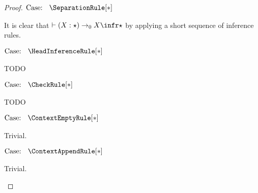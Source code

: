 \begin{proof}
$\text{Case: }\begin{array}{c} \SeparationRule[*] \end{array}$
\begin{proofcase}
    It is clear that $\vdash (X : \star) \to_0 X \infr \star$ by applying a short sequence of inference rules.
\end{proofcase}

$\text{Case: }\begin{array}{c} \HeadInferenceRule[*] \end{array}$
\begin{proofcase}
    TODO
\end{proofcase}

$\text{Case: }\begin{array}{c} \CheckRule[*] \end{array}$
\begin{proofcase}
    TODO
\end{proofcase}

$\text{Case: }\begin{array}{c} \ContextEmptyRule[*] \end{array}$
\begin{proofcase}
    Trivial.
\end{proofcase}

$\text{Case: }\begin{array}{c} \ContextAppendRule[*] \end{array}$
\begin{proofcase}
    Trivial.
\end{proofcase}
\end{proof}
